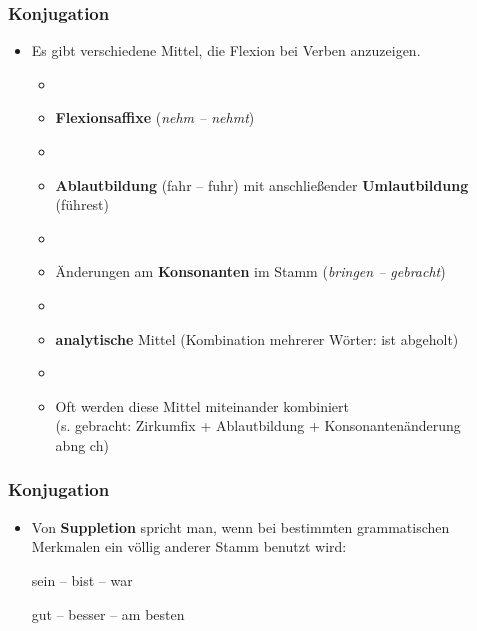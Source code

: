 
\begin{frame}
\frametitle{Konjugation}

\begin{itemize}
	\item Es gibt verschiedene Mittel, die Flexion bei Verben anzuzeigen. 
	
	\begin{itemize}
	\item[]
	\item \textbf{Flexionsaffixe} (\textit{nehm -- nehmt}) 
	\item[]
	\item \textbf{Ablautbildung} (fahr -- fuhr) mit anschließender \textbf{Umlautbildung} (führest) 
	\item[]
	\item Änderungen am \textbf{Konsonanten} im Stamm (\textit{bringen -- gebracht})
	\item[]
	\item \textbf{analytische} Mittel (Kombination mehrerer Wörter: ist abgeholt) 
	\item[]
	\item Oft werden diese Mittel miteinander kombiniert\\
	(s. gebracht: Zirkumfix  + Ablautbildung  + Konsonantenänderung \\ab{ng \ras ch})
	\end{itemize}

\end{itemize}


\end{frame}




\begin{frame}
\frametitle{Konjugation}

\begin{itemize}
	\item Von \textbf{Suppletion} spricht man, wenn bei bestimmten grammatischen Merkmalen ein völlig anderer Stamm benutzt wird:
	
\vspace{1em}
	
	\ea sein -- bist -- war
	\z
	
	\ea gut -- besser -- am besten
	\z
	
	
	
\end{itemize}


\end{frame}


